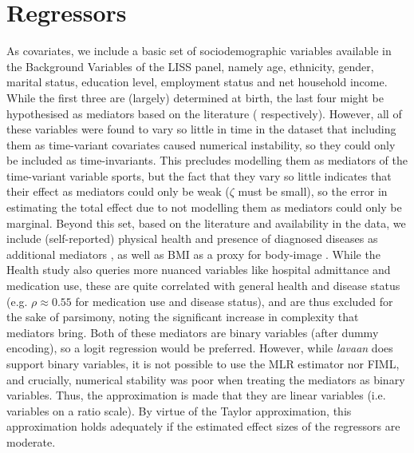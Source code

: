 \section{Regressors}
\label{sec:modelling:regressors}
As covariates, we include a basic set of sociodemographic variables available in the Background Variables of the LISS panel,
namely age, ethnicity, gender, marital status, education level, employment status and net household income.
While the first three are (largely) determined at birth, the last four might be hypothesised as mediators based on the literature
( respectively).
However, all of these variables were found to vary so little in time in the dataset that including them as time-variant
covariates caused numerical instability, so they could only be included as time-invariants.
This precludes modelling them as mediators of the time-variant variable sports,
but the fact that they vary so little indicates that their effect as mediators could only be weak ($\zeta$ must be small),
so the error in estimating the total effect due to not modelling them as mediators could only be marginal.
Beyond this set, based on the literature and availability in the data, we include (self-reported) physical health
and presence of diagnosed diseases as additional mediators \cite{westcott2012resistance},
as well as BMI as a proxy for body-image \cite{westcott2012resistance}.
While the Health study also queries more nuanced variables like hospital admittance and medication use, these are
quite correlated with general health and disease status (e.g. $\rho \approx 0.55$ for medication use and disease status),
and are thus excluded for the sake of parsimony, noting the significant increase in complexity that mediators bring.
Both of these mediators are binary variables (after dummy encoding), so a logit regression would be preferred.
However, while \textit{lavaan} does support binary variables, it is not possible to use the MLR estimator nor FIML,
and crucially, numerical stability was poor when treating the mediators as binary variables.
Thus, the approximation is made that they are linear variables (i.e. variables on a ratio scale).
By virtue of the Taylor approximation, this approximation holds adequately if the estimated effect sizes of the regressors
are moderate.

